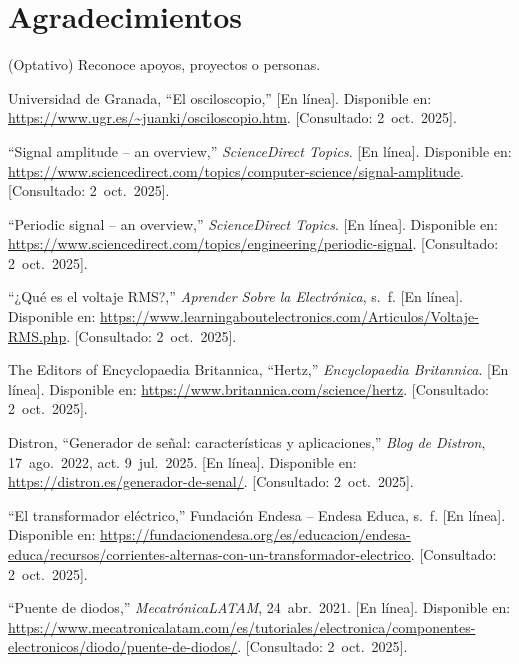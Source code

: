 \documentclass[conference]{IEEEtran} %
\begin{document}
\section*{Agradecimientos}
(Optativo) Reconoce apoyos, proyectos o personas.

\begin{thebibliography}{00}

Universidad de Granada, ``El osciloscopio,'' [En línea]. Disponible en: \url{https://www.ugr.es/~juanki/osciloscopio.htm}. [Consultado: 2~oct.~2025].

``Signal amplitude -- an overview,'' \emph{ScienceDirect Topics}. [En línea]. Disponible en: \url{https://www.sciencedirect.com/topics/computer-science/signal-amplitude}. [Consultado: 2~oct.~2025].

``Periodic signal -- an overview,'' \emph{ScienceDirect Topics}. [En línea]. Disponible en: \url{https://www.sciencedirect.com/topics/engineering/periodic-signal}. [Consultado: 2~oct.~2025].

``¿Qué es el voltaje RMS?,'' \emph{Aprender Sobre la Electrónica}, s.~f. [En línea]. Disponible en: \url{https://www.learningaboutelectronics.com/Articulos/Voltaje-RMS.php}. [Consultado: 2~oct.~2025].

The Editors of Encyclopaedia Britannica, ``Hertz,'' \emph{Encyclopaedia Britannica}. [En línea]. Disponible en: \url{https://www.britannica.com/science/hertz}. [Consultado: 2~oct.~2025].

Distron, ``Generador de señal: características y aplicaciones,'' \emph{Blog de Distron}, 17~ago.~2022, act. 9~jul.~2025. [En línea]. Disponible en: \url{https://distron.es/generador-de-senal/}. [Consultado: 2~oct.~2025].

``El transformador eléctrico,'' Fundación Endesa -- Endesa Educa, s.~f. [En línea]. Disponible en: \url{https://fundacionendesa.org/es/educacion/endesa-educa/recursos/corrientes-alternas-con-un-transformador-electrico}. [Consultado: 2~oct.~2025].

``Puente de diodos,'' \emph{MecatrónicaLATAM}, 24~abr.~2021. [En línea]. Disponible en: \url{https://www.mecatronicalatam.com/es/tutoriales/electronica/componentes-electronicos/diodo/puente-de-diodos/}. [Consultado: 2~oct.~2025].

\end{thebibliography}

\end{document}
